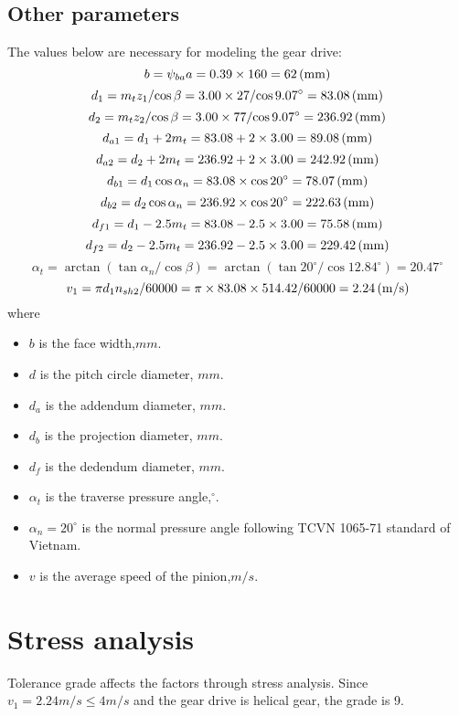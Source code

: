 \subsection{Other parameters}
The values below are necessary for modeling the gear drive:\\
\[ b = \psi_{ba}a = 0.39\times 160= 62\, (\mathrm{mm})\]
\[ d_1 = {m_tz_1}/{\cos\beta} = {3.00\times 27}/{\cos9.07^\circ} = 83.08\, (\mathrm{mm})\]
\[ d_2 = {m_tz_2}/{\cos\beta} = {3.00\times 77}/{\cos9.07^\circ} = 236.92\, (\mathrm{mm})\]
\[ d_{a1} = d_1 + 2m_t = 83.08 + 2\times 3.00 = 89.08\, (\mathrm{mm})\]
\[ d_{a2} = d_2 + 2m_t = 236.92 + 2\times 3.00 = 242.92\, (\mathrm{mm})\]
\[ d_{b1} = d_1\cos\alpha_n = 83.08\times \cos 20^\circ = 78.07\, (\mathrm{mm})\]
\[ d_{b2} = d_2\cos\alpha_n = 236.92\times \cos 20^\circ = 222.63 \, (\mathrm{mm})\]
\[ d_{f1} = d_1 - 2.5m_t = 83.08 - 2.5\times 3.00 = 75.58\, (\mathrm{mm})\]
\[ d_{f2} = d_2 - 2.5m_t = 236.92 - 2.5\times 3.00 = 229.42\, (\mathrm{mm})\]
\[ \alpha_t = \arctan\left({\tan\alpha_n}/{\cos\beta}\right) = \arctan\left({\tan 20^\circ}/{\cos 12.84^\circ}\right) = 20.47^\circ\]
\[ v_1 = {\pi d_1n_{sh2}}/{60000} = {\pi \times 83.08 \times 514.42}/{60000} = 2.24\, (\mathrm{m/s})\]
where
\begin{itemize}
	\item $ b $ is the face width,$ \unit{mm} $.
	\item $ d $ is the pitch circle diameter, $ \unit{mm} $.
	\item $ d_a $ is the addendum diameter, $ \unit{mm} $.
	\item $ d_b $ is the projection diameter, $ \unit{mm} $.
	\item $ d_f $ is the dedendum diameter, $ \unit{mm} $.
	\item $ \alpha_t $ is the traverse pressure angle,$ ^\circ $.
	\item $ \alpha_n=20^\circ $ is the normal pressure angle following TCVN 1065-71 standard of Vietnam.
	\item $ v $ is the average speed of the pinion,$ \unit{m/s} $.
\end{itemize}

\section{Stress analysis}
Tolerance grade affects the factors through stress analysis. Since $ v_1=2.24 \unit{m/s} \leq 4 \unit{m/s} $ and the gear drive is helical gear, the grade is 9.
